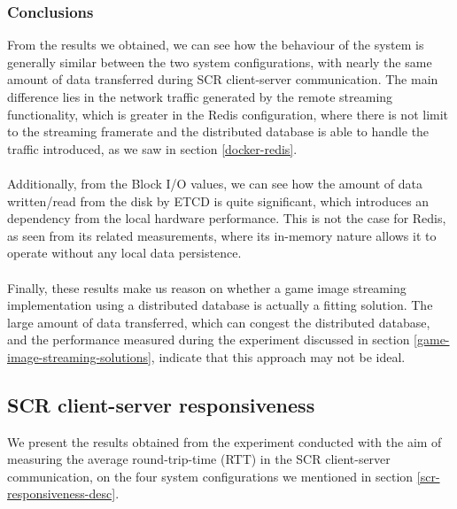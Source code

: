 \subsubsection{Conclusions}
From the results we obtained, we can see how the behaviour of the system is generally similar between the two system configurations, with nearly the same amount of data transferred during SCR client-server communication. The main difference lies in the network traffic generated by the remote streaming functionality, which is greater in the Redis configuration, where there is not limit to the streaming framerate and the distributed database is able to handle the traffic introduced, as we saw in section \ref{docker-redis}. \\ \\
Additionally, from the Block I/O values, we can see how the amount of data written/read from the disk by ETCD is quite significant, which introduces an dependency from the local hardware performance. This is not the case for Redis, as seen from its related measurements, where its in-memory nature allows it to operate without any local data persistence. \\ \\
Finally, these results make us reason on whether a game image streaming implementation using a distributed database is actually a fitting solution. The large amount of data transferred, which can congest the distributed database, and the performance measured during the experiment discussed in section \ref{game-image-streaming-solutions}, indicate that this approach may not be ideal.

\subsection{SCR client-server responsiveness}
We present the results obtained from the experiment conducted with the aim of measuring the average round-trip-time (RTT) in the SCR client-server communication, on the four system configurations we mentioned in section \ref{scr-responsiveness-desc}.



